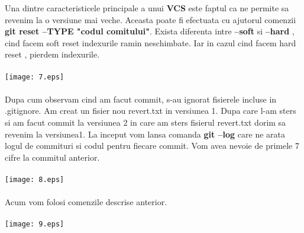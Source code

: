 \tab Una dintre caracteristicele principale a unui \textbf{VCS} este faptul ca
ne permite sa revenim la o versiune mai veche. Aceasta poate fi efectuata cu ajutorul
comenzii \textbf{git reset --TYPE "codul comitului"}. Exista diferenta intre 
\textbf{--soft} si \textbf{--hard} , cind facem soft reset indexurile ramin neschimbate.
Iar in cazul cind facem hard reset , pierdem indexurile.
\\
\\
\texttt{[image: 7.eps]}
\\
\\
Dupa cum observam cind am facut commit, s-au ignorat fisierele incluse in .gitignore.
\clearpage
\tab Am creat un fisier nou revert.txt in versiunea 1. Dupa care l-am sters si am facut
commit la versiunea 2 in care am sters fisierul revert.txt dorim sa revenim la versiunea1. La inceput vom lansa comanda \textbf{git --log} care ne arata logul de commituri si
codul pentru fiecare commit. Vom avea nevoie de primele 7 cifre la commitul anterior.\\
\\
\texttt{[image: 8.eps]}\\
\\
Acum vom folosi comenzile descrise anterior.\\
\\
\texttt{[image: 9.eps]}\\
